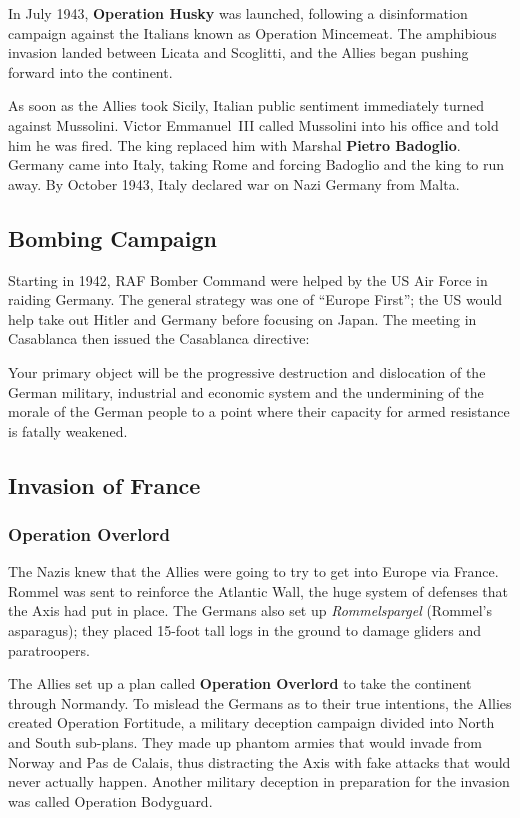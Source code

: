In July 1943, \textbf{Operation Husky} was launched,
following a disinformation campaign against the Italians known as Operation Mincemeat.
The amphibious invasion landed between Licata and Scoglitti,
and the Allies began pushing forward into the continent.

As soon as the Allies took Sicily, Italian public sentiment immediately turned against Mussolini.
Victor Emmanuel~III called Mussolini into his office and told him he was fired.
The king replaced him with Marshal \textbf{Pietro Badoglio}.
Germany came into Italy, taking Rome and forcing Badoglio and the king to run away.
By October 1943, Italy declared war on Nazi Germany from Malta.

\subsection*{Bombing Campaign}

Starting in 1942, RAF Bomber Command were helped by the US Air Force in raiding Germany.
The general strategy was one of ``Europe First'';
the US would help take out Hitler and Germany before focusing on Japan.
The meeting in Casablanca then issued the Casablanca directive:
\begin{quoting}
Your primary object will be the progressive destruction and dislocation
of the German military, industrial and economic system
and the undermining of the morale of the German people
to a point where their capacity for armed resistance is fatally weakened.
\end{quoting}

\subsection*{Invasion of France}

\subsubsection*{Operation Overlord}

The Nazis knew that the Allies were going to try to get into Europe via France.
Rommel was sent to reinforce the Atlantic Wall,
the huge system of defenses that the Axis had put in place.
The Germans also set up \textit{Rommelspargel} (Rommel's asparagus);
they placed 15-foot tall logs in the ground to damage gliders and paratroopers.

The Allies set up a plan called \textbf{Operation Overlord} to take the continent through Normandy.
To mislead the Germans as to their true intentions, the Allies created Operation Fortitude,
a military deception campaign divided into North and South sub-plans.
They made up phantom armies that would invade from Norway and Pas de Calais,
thus distracting the Axis with fake attacks that would never actually happen.
Another military deception in preparation for the invasion was called Operation Bodyguard.

